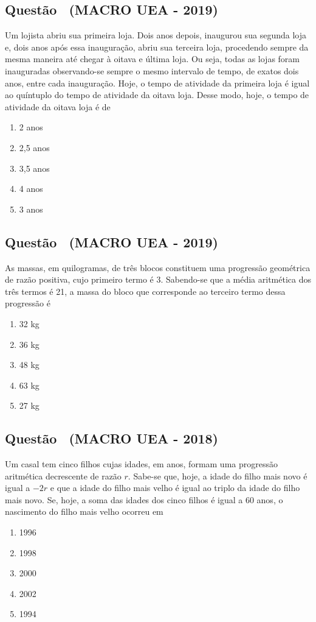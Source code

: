 \documentclass[12pt]{article}
\newcounter{questao}
\newcommand{\novaquestao}[1]{%
  \stepcounter{questao}%
  \subsection*{Questão \thequestao\ (#1)}%
}
\begin{document}
\begin{multicols}{2}
        \novaquestao{MACRO UEA - 2019}
            Um lojista abriu sua primeira loja. Dois anos depois, inaugurou sua segunda loja e, dois anos após essa inauguração, abriu sua terceira loja, procedendo sempre da mesma maneira até chegar à oitava e última loja. Ou seja, todas as lojas foram inauguradas observando-se sempre o mesmo intervalo de tempo, de exatos dois anos, entre cada inauguração. Hoje, o tempo de atividade da primeira loja é igual ao quíntuplo do tempo de atividade da oitava loja. Desse modo, hoje, o tempo de atividade da oitava loja é de

            \begin{enumerate}[label=(\alph*), noitemsep]
                \item 2 anos
                \item 2,5 anos
                \item 3,5 anos
                \item 4 anos
                \item 3 anos
            \end{enumerate}

        \novaquestao{MACRO UEA - 2019}
            As massas, em quilogramas, de três blocos constituem uma progressão geométrica de razão positiva, cujo primeiro termo é 3. Sabendo-se que a média aritmética dos três termos é 21, a massa do bloco que corresponde ao terceiro termo dessa progressão é

            \begin{enumerate}[label=(\alph*), noitemsep]
                \item 32 kg
                \item 36 kg
                \item 48 kg
                \item 63 kg
                \item 27 kg
            \end{enumerate}

        \novaquestao{MACRO UEA - 2018}
        
            Um casal tem cinco filhos cujas idades, em anos, formam uma progressão aritmética decrescente de razão $r$. Sabe-se que, hoje, a idade do filho mais novo é igual a $-2r$ e que a idade do filho mais velho é igual ao triplo da idade do filho mais novo. Se, hoje, a soma das idades dos cinco filhos é igual a 60 anos, o nascimento do filho mais velho ocorreu em
        
    
            \begin{enumerate}[label=(\alph*), noitemsep]
                \item 1996
                \item 1998
                \item 2000
                \item 2002
                \item 1994
            \end{enumerate}


\end{multicols}
\end{document}
